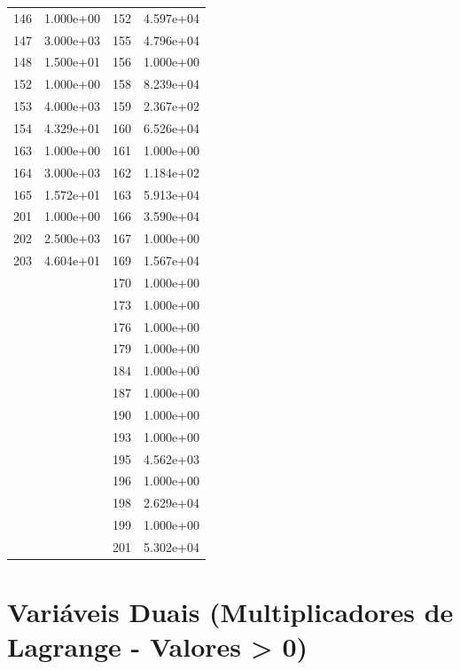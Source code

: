 \documentclass[12pt]{article}
\begin{document}
\begin{longtable}{@{}cccc@{}}
146 & 1.000e+00 & 152 & 4.597e+04 \\
147 & 3.000e+03 & 155 & 4.796e+04 \\
148 & 1.500e+01 & 156 & 1.000e+00 \\
152 & 1.000e+00 & 158 & 8.239e+04 \\
153 & 4.000e+03 & 159 & 2.367e+02 \\
154 & 4.329e+01 & 160 & 6.526e+04 \\
163 & 1.000e+00 & 161 & 1.000e+00 \\
164 & 3.000e+03 & 162 & 1.184e+02 \\
165 & 1.572e+01 & 163 & 5.913e+04 \\
201 & 1.000e+00 & 166 & 3.590e+04 \\
202 & 2.500e+03 & 167 & 1.000e+00 \\
203 & 4.604e+01 & 169 & 1.567e+04 \\
 &  & 170 & 1.000e+00 \\
 &  & 173 & 1.000e+00 \\
 &  & 176 & 1.000e+00 \\
 &  & 179 & 1.000e+00 \\
 &  & 184 & 1.000e+00 \\
 &  & 187 & 1.000e+00 \\
 &  & 190 & 1.000e+00 \\
 &  & 193 & 1.000e+00 \\
 &  & 195 & 4.562e+03 \\
 &  & 196 & 1.000e+00 \\
 &  & 198 & 2.629e+04 \\
 &  & 199 & 1.000e+00 \\
 &  & 201 & 5.302e+04 \\

\bottomrule
\end{longtable}


\section{Variáveis Duais (Multiplicadores de Lagrange - Valores > 0)}
\end{document}
